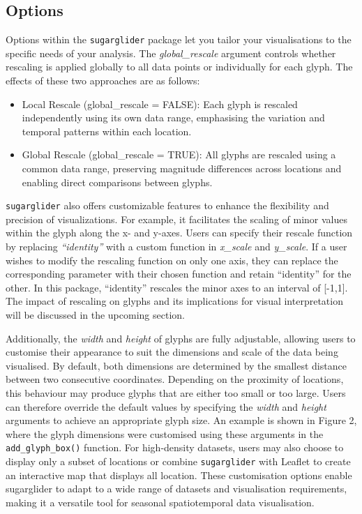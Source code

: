 \hypertarget{options}{%
\subsection{Options}\label{options}}

Options within the \texttt{sugarglider} package let you tailor your visualisations to the specific needs of your analysis. The \emph{global\_rescale} argument controls whether rescaling is applied globally to all data points or individually for each glyph. The effects of these two approaches are as follows:

\begin{itemize}
\tightlist
\item
  Local Rescale (global\_rescale = FALSE): Each glyph is rescaled independently using its own data range, emphasising the variation and temporal patterns within each location.
\item
  Global Rescale (global\_rescale = TRUE): All glyphs are rescaled using a common data range, preserving magnitude differences across locations and enabling direct comparisons between glyphs.
\end{itemize}

\texttt{sugarglider} also offers customizable features to enhance the flexibility and precision of visualizations. For example, it facilitates the scaling of minor values within the glyph along the x- and y-axes. Users can specify their rescale function by replacing \emph{``identity''} with a custom function in \emph{x\_scale} and \emph{y\_scale}. If a user wishes to modify the rescaling function on only one axis, they can replace the corresponding parameter with their chosen function and retain ``identity'' for the other. In this package, ``identity'' rescales the minor axes to an interval of {[}-1,1{]}. The impact of rescaling on glyphs and its implications for visual interpretation will be discussed in the upcoming section.

Additionally, the \emph{width} and \emph{height} of glyphs are fully adjustable, allowing users to customise their appearance to suit the dimensions and scale of the data being visualised. By default, both dimensions are determined by the smallest distance between two consecutive coordinates. Depending on the proximity of locations, this behaviour may produce glyphs that are either too small or too large. Users can therefore override the default values by specifying the \emph{width} and \emph{height} arguments to achieve an appropriate glyph size. An example is shown in Figure 2, where the glyph dimensions were customised using these arguments in the \texttt{add\_glyph\_box()} function. For high-density datasets, users may also choose to display only a subset of locations or combine \texttt{sugarglider} with Leaflet to create an interactive map that displays all location. These customisation options enable sugarglider to adapt to a wide range of datasets and visualisation requirements, making it a versatile tool for seasonal spatiotemporal data visualisation.

